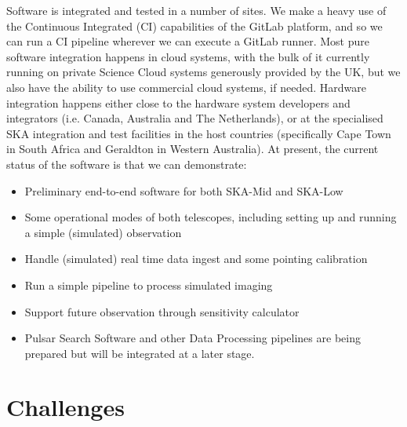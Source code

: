 \documentclass[a4paper,
               biblatex,     %
               keeplastbox,   %
               ]{jacow}
\begin{document}
Software is integrated and tested in a number of sites. We make a heavy use of the Continuous Integrated (CI) capabilities of the GitLab platform, and so we can run a CI pipeline wherever we can execute a GitLab runner. Most pure software integration happens in cloud systems, with the bulk of it currently running on private Science Cloud systems generously provided by the UK, but we also have the ability to use commercial cloud systems, if needed. Hardware integration happens either close to the hardware system developers and integrators (i.e. Canada, Australia and The Netherlands), or at the specialised SKA integration and test facilities in the host countries (specifically Cape Town in South Africa and Geraldton in Western Australia). At present, the current status of the software is that we can demonstrate:
\begin{itemize}
    \item Preliminary end-to-end software for both SKA-Mid and SKA-Low
    \item Some operational modes of both telescopes, including setting up and running a simple (simulated) observation
    \item Handle (simulated) real time data ingest and some pointing calibration
    \item Run a simple pipeline to process simulated imaging
    \item Support future observation through sensitivity calculator
    \item Pulsar Search Software and other Data Processing pipelines are being prepared but will be integrated at a later stage.
\end{itemize}





\section{Challenges}
\end{document}
